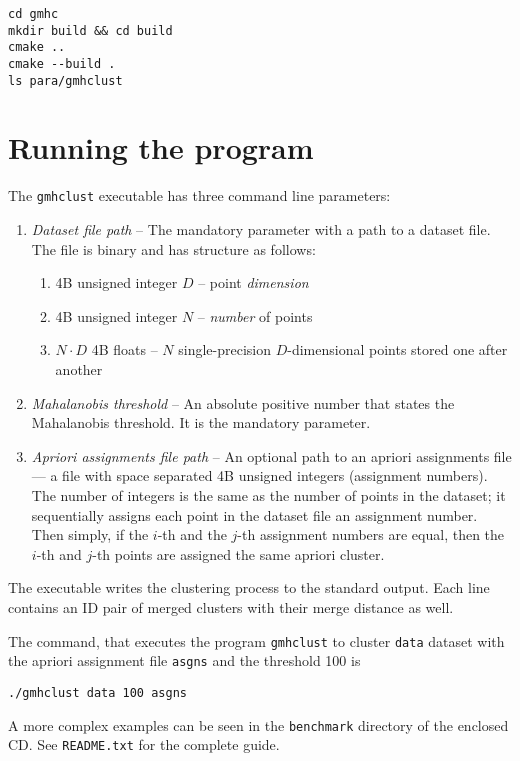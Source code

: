 \documentclass[12pt,a4paper,twoside,openright]{report}
\begin{document}
\begin{lstlisting}
cd gmhc
mkdir build && cd build
cmake ..
cmake --build .
ls para/gmhclust
\end{lstlisting}

\section{Running the program}

The \texttt{gmhclust} executable has three command line parameters:
\begin{enumerate}
	\item \emph{Dataset file path} -- The mandatory parameter with a path to a dataset file. The file is binary and has structure as follows:
	\begin{enumerate}
		\item 4B unsigned integer $D$ -- point \emph{dimension}
		\item 4B unsigned integer $N$ -- \emph{number} of points
		\item $N\cdot D$ 4B floats -- $N$ single-precision $D$-dimensional points stored one after another
	\end{enumerate}
	\item \emph{Mahalanobis threshold} -- An absolute positive number that states the Mahalanobis threshold. It is the mandatory parameter.
	\item \emph{Apriori assignments file path} -- An optional path to an apriori assignments file --- a file with space separated 4B unsigned integers (assignment numbers). The number of integers is the same as the number of points in the dataset; it sequentially assigns each point in the dataset file an assignment number. Then simply, if the $i$-th and the $j$-th assignment numbers are equal, then the $i$-th and $j$-th points are assigned the same apriori cluster. 
\end{enumerate}

The executable writes the clustering process to the standard output. Each line contains an ID pair of merged clusters with their merge distance as well. 

The command, that executes the program \texttt{gmhclust} to cluster \texttt{data} dataset with the apriori assignment file \texttt{asgns} and the threshold 100 is 
\begin{lstlisting}
./gmhclust data 100 asgns
\end{lstlisting}

A more complex examples can be seen in the \texttt{benchmark} directory of the enclosed CD. See \texttt{README.txt} for the complete guide.
\end{document}
